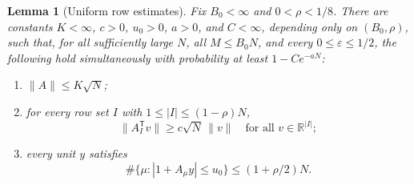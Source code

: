 \documentclass[11pt,a4paper]{article}
\numberwithin{equation}{section}
\newtheorem{lemma}[theorem]{Lemma}
\theoremstyle{definition}
\theoremstyle{remark}
\newcommand{\R}{\mathbb R}
\newcommand{\eps}{\varepsilon}
\begin{document}
\begin{lemma}[Uniform row estimates]
\label{thresh:uniform-geometry}
Fix $B_0<\infty$ and $0<\rho<1/8$.  There are constants
$K<\infty$, $c>0$, $u_0>0$, $a>0$, and $C<\infty$, depending only on
$(B_0,\rho)$, such that, for all sufficiently large $N$, all
$M\leq B_0N$, and every $0\leq\eps\leq1/2$, the following hold
simultaneously with probability at least $1-Ce^{-aN}$:
\begin{enumerate}
\item $\|A\|\leq K\sqrt N$;
\item for every row set $I$ with $1\leq|I|\leq(1-\rho)N$,
\begin{equation}
 \|A_I^{\mathsf T}v\|\geq c\sqrt N\,\|v\|
       \quad\text{for all }v\in\R^{|I|};
 \label{thresh:eq:surjection}
\end{equation}
\item every unit $y$ satisfies
\begin{equation}
 \#\{\mu:|1+A_\mu y|\leq u_0\}\leq(1+\rho/2)N.
 \label{thresh:eq:gap-count}
\end{equation}
\end{enumerate}
\end{lemma}
\end{document}
